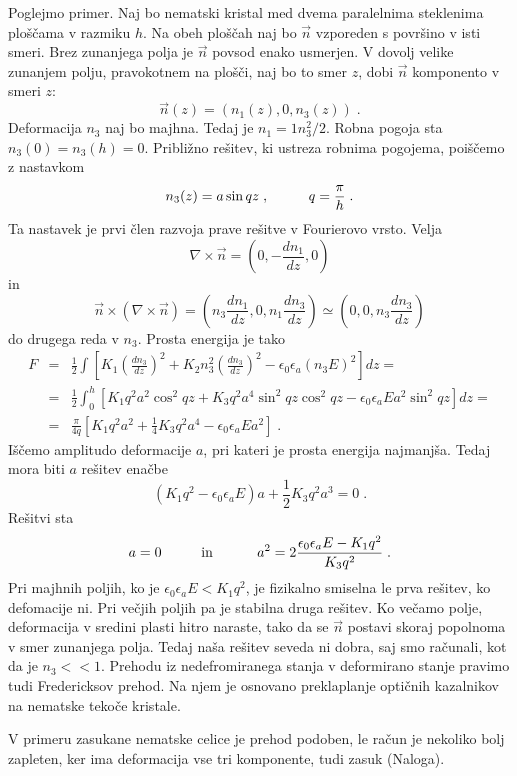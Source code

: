 Poglejmo primer. Naj bo nematski kristal med dvema paralelnima steklenima
ploščama v razmiku $h$. Na obeh ploščah naj bo $\vec{n}$ vzporeden
s površino v isti smeri. Brez zunanjega polja je $\vec{n}$ povsod
enako usmerjen. V dovolj velike zunanjem polju, pravokotnem na plošči,
naj bo to smer $z$, dobi $\vec{n}$ komponento v smeri $z$: 
\begin{equation}
\vec{n}(z)=(n_{1}(z),0,n_{3}(z))\;.\label{7.73}
\end{equation}
 Deformacija $n_{3}$ naj bo majhna. Tedaj je $n_{1}=1n_{3}^{2}/2$.
Robna pogoja sta $n_{3}(0)=n_{3}(h)=0$. Približno rešitev, ki ustreza
robnima pogojema, poiščemo z nastavkom 
\begin{equation}
n_{3}(z)=a\sin qz\;,\mbox{\hskip1cm}q=\frac{\pi}{h}\;.\label{7.74}
\end{equation}
 Ta nastavek je prvi člen razvoja prave rešitve v Fourierovo vrsto.
Velja 
\begin{equation}
\nabla\times\vec{n}=(0,-\frac{dn_{1}}{dz},0)\label{7.75}
\end{equation}
 in 
\begin{equation}
\vec{n}\times(\nabla\times\vec{n})=(n_{3}\frac{dn_{1}}{dz},0,n_{1}\frac{dn_{3}}{dz})\simeq(0,0,n_{3}\frac{dn_{3}}{dz})\label{7.76}
\end{equation}
 do drugega reda v $n_{3}$. Prosta energija je tako 
\begin{eqnarray}
F & = & \frac{1}{2}\int\left[K_{1}\left(\frac{dn_{3}}{dz}\right)^{2}+K_{2}n_{3}^{2}\left(\frac{dn_{3}}{dz}\right)^{2}-\epsilon_{0}\epsilon_{a}(n_{3}E)^{2}\right]dz=\nonumber \\
 & = & \frac{1}{2}\int_{0}^{h}[K_{1}q^{2}a^{2}\cos^{2}qz+K_{3}q^{2}a^{4}\sin^{2}qz\cos^{2}qz-\epsilon_{0}\epsilon_{a}Ea^{2}\sin^{2}qz]dz=\nonumber \\
 & = & \frac{\pi}{4q}[K_{1}q^{2}a^{2}+\frac{1}{4}K_{3}q^{2}a^{4}-\epsilon_{0}\epsilon_{a}Ea^{2}]\;.
\end{eqnarray}
 Iščemo amplitudo deformacije $a$, pri kateri je prosta energija
najmanjša. Tedaj mora biti $a$ rešitev enačbe 
\begin{equation}
(K_{1}q^{2}-\epsilon_{0}\epsilon_{a}E)a+\frac{1}{2}K_{3}q^{2}a^{3}=0\;.\label{7.78}
\end{equation}
 Rešitvi sta 
\begin{equation}
a=0\mbox{\hskip1cm in \hskip1cm}a^{2}=2\frac{\epsilon_{0}\epsilon_{a}E-K_{1}q^{2}}{K_{3}q^{2}}\;.\label{7.79}
\end{equation}
 Pri majhnih poljih, ko je $\epsilon_{0}\epsilon_{a}E<K_{1}q^{2}$,
je fizikalno smiselna le prva rešitev, ko defomacije ni. Pri večjih
poljih pa je stabilna druga rešitev. Ko večamo polje, deformacija
v sredini plasti hitro naraste, tako da se $\vec{n}$ postavi skoraj
popolnoma v smer zunanjega polja. Tedaj naša rešitev seveda ni dobra,
saj smo računali, kot da je $n_{3}<<1$. Prehodu iz nedefromiranega
stanja v deformirano stanje pravimo tudi Fredericksov prehod. Na njem
je osnovano preklaplanje optičnih kazalnikov na nematske tekoče kristale.

V primeru zasukane nematske celice je prehod podoben, le račun je
nekoliko bolj zapleten, ker ima deformacija vse tri komponente, tudi
zasuk (Naloga).